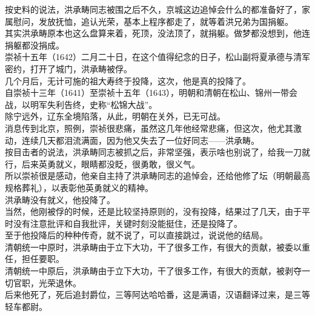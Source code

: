 \begin{multicols}{\theparacolNo}
按史料的说法，洪承畴同志被围之后不久，京城这边追悼会什么的都准备好了，家属慰问，发放抚恤，追认光荣，基本上程序都走了，就等着洪兄弟为国捐躯。\\

其实洪承畴原本也这么盘算来着，死顶，没法顶了，就捐躯。做梦都没想到，他连捐躯都没捐成。\\

崇祯十五年（1642）二月二十日，在这个值得纪念的日子，松山副将夏承德与清军密约，打开了城门，洪承畴被俘。\\

几个月后，无计可施的祖大寿终于投降，这次，他是真的投降了。\\

自崇祯十三年（1641）至崇祯十五年（1643），明朝和清朝在松山、锦州一带会战，以明军失利告终，史称“松锦大战”。\\

除宁远外，辽东全境陷落，从此，明朝在关外，已无可战。\\

消息传到北京，照例，崇祯很悲痛，虽然这几年他经常悲痛，但这次，他尤其激动，连续几天都泪流满面，因为他又失去了一位好同志——洪承畴。\\

按目击者的说法，洪承畴同志被抓之后，非常坚强，表示啥也别说了，给我一刀就行，后来英勇就义，眼睛都没眨，很勇敢，很义气。\\

所以崇祯很是感动，他亲自主持了洪承畴同志的追悼会，还给他修了坛（明朝最高规格葬礼），以表彰他英勇就义的精神。\\

洪承畴没有就义，他投降了。\\

当然，他刚被俘的时候，还是比较坚持原则的，没有投降，结果过了几天，由于平时没有注意批评和自我批评，关键时刻没能挺住，还是投降了。\\

至于他投降后的种种传奇，就不说了，可以直接跳过，说说他的结局。\\

清朝统一中原时，洪承畴由于立下大功，干了很多工作，有很大的贡献，被委以重任，担任要职。\\

清朝统一中原后，洪承畴由于立下大功，干了很多工作，有很大的贡献，被剥夺一切官职，光荣退休。\\

后来他死了，死后追封爵位，三等阿达哈哈番，这是满语，汉语翻译过来，是三等轻车都尉。\\


\end{multicols}
